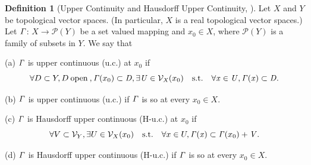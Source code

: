 \documentclass[a4paper,11pt]{jsarticle}
\theoremstyle{definition}
\newtheorem{dfn}{Definition}[section]
\newcommand{\SuchThat}{\quad\text{s.t.}\quad}
\newcommand{\SetValudMapping}{\it \Gamma}
\begin{document}
\begin{dfn}[Upper Continuity and Hausdorff Upper Continuity, \cite{Tammer03}]
  Let $X$ and $Y$ be topological vector spaces. (In particular, $X$ is a real topological vector spaces.) Let $\SetValudMapping$: $X \rightarrow \mathcal{P}(Y)$ be a set valued mapping and
  $x_0 \in X$, where $\mathcal{P}(Y)$ is a family of subsets in $Y$. We say that

  (a) $\SetValudMapping$ is upper continuous (u.c.) at $x_0$ if
  \begin{equation}
    \forall D \subset Y, D \:\text{open}\:, \SetValudMapping (\text{$x_0$}) \subset D, \exists U \in \mathcal{V}_{X}(\text{$x_0$}) \SuchThat \forall x \in U, \SetValudMapping (x) \subset D. \notag
  \end{equation}

  (b) $\SetValudMapping$ is upper continuous (u.c.) if $\SetValudMapping$ is so at every $x_0 \in X$.

  (c) $\SetValudMapping$ is Hausdorff upper continuous (H-u.c.) at $x_0$ if
  \begin{equation}
    \forall V \subset \mathcal{V}_Y, \exists U \in \mathcal{V}_{X}(\text{$x_0$}) \SuchThat \forall x \in U, \SetValudMapping (x) \subset \SetValudMapping (\text{$x_0$}) + V. \notag
  \end{equation}

  (d) $\SetValudMapping$ is Hausdorff upper continuous (H-u.c.) if $\SetValudMapping$ is so at every $x_0 \in X$.
\end{dfn}
\end{document}
